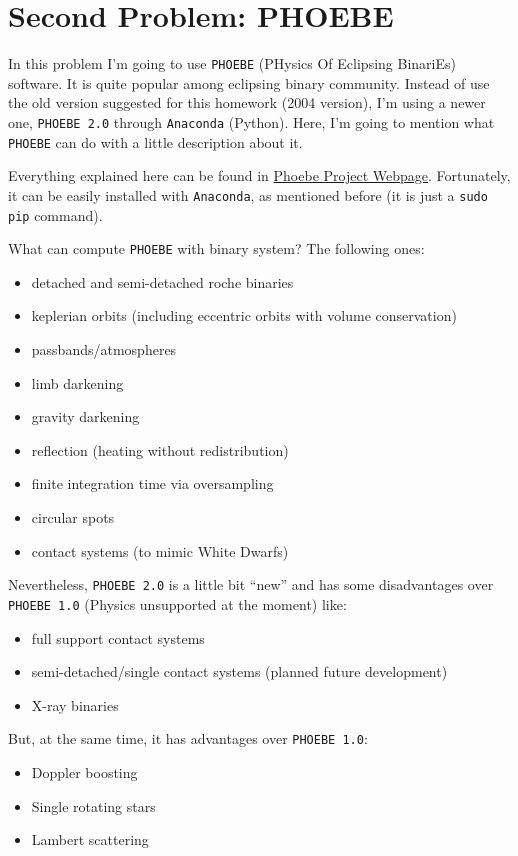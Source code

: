 \section{Second Problem: PHOEBE}
\label{p2}

In this problem I'm going to use \texttt{PHOEBE} (PHysics Of Eclipsing BinariEs) software. It is quite popular among eclipsing binary community. Instead of use the old version suggested for this homework (2004 version), I'm using a newer one, \texttt{PHOEBE 2.0} through \texttt{Anaconda} (Python). Here, I'm going to mention what \texttt{PHOEBE} can do with a little description about it.

Everything explained here can be found in \href{http://phoebe-project.org/}{Phoebe Project Webpage}. Fortunately, it can be easily installed with \texttt{Anaconda}, as mentioned before (it is just a \texttt{sudo pip} command). 

What can compute \texttt{PHOEBE} with binary system? The following ones:

\begin{itemize}
\item detached and semi-detached roche binaries
\item keplerian orbits (including eccentric orbits with volume conservation)
\item passbands/atmospheres
\item limb darkening
\item gravity darkening
\item reflection (heating without redistribution)
\item finite integration time via oversampling
\item circular spots
\item contact systems (to mimic White Dwarfs)
\end{itemize}

Nevertheless, \texttt{PHOEBE 2.0} is a little bit ``new'' and has some disadvantages over \texttt{PHOEBE 1.0} (Physics unsupported at the moment) like:

\begin{itemize}
\item full support contact systems
\item semi-detached/single contact systems (planned future development)
\item  X-ray binaries
\end{itemize}

But, at the same time, it has advantages over \texttt{PHOEBE 1.0}:
\begin{itemize}
\item Doppler boosting
\item Single rotating stars
\item Lambert scattering


\end{itemize}

